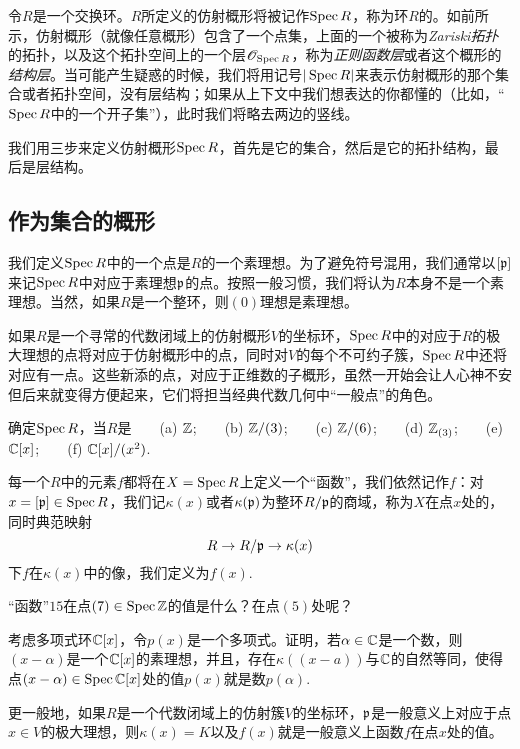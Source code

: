 令$R$是一个交换环。$R$所定义的仿射概形将被记作$\operatorname{Spec} R$，称为环$R$的。如前所示，仿射概形（就像任意概形）包含了一个点集，上面的一个被称为\textit{Zariski拓扑}的拓扑，以及这个拓扑空间上的一个层$\mathscr{O}_{\operatorname{Spec} R}$，称为\textit{正则函数层}或者这个概形的\textit{结构层}。当可能产生疑惑的时候，我们将用记号$|\operatorname{Spec} R|$来表示仿射概形的那个集合或者拓扑空间，没有层结构；如果从上下文中我们想表达的你都懂的（比如，“$\operatorname{Spec} R$中的一个开子集”），此时我们将略去两边的竖线。

我们用三步来定义仿射概形$\operatorname{Spec} R$，首先是它的集合，然后是它的拓扑结构，最后是层结构。

\subsection{作为集合的概形}

我们定义$\operatorname{Spec} R$中的一个点是$R$的一个素理想。为了避免符号混用，我们通常以$[\mathfrak{p}]$来记$\operatorname{Spec} R$中对应于素理想$\mathfrak{p}$的点。按照一般习惯，我们将认为$R$本身不是一个素理想。当然，如果$R$是一个整环，则$(0)$理想是素理想。

如果$R$是一个寻常的代数闭域上的仿射概形$V$的坐标环，$\operatorname{Spec} R$中的对应于$R$的极大理想的点将对应于仿射概形中的点，同时对$V$的每个不可约子簇，$\operatorname{Spec} R$中还将对应有一点。这些新添的点，对应于正维数的子概形，虽然一开始会让人心神不安但后来就变得方便起来，它们将担当经典代数几何中“一般点”的角色。

\begin{exe}
确定$\operatorname{Spec} R$，当$R$是~~~~(a) $\mathbb{Z}$;~~~~(b) $\mathbb{Z}/(3)$;~~~~(c) $\mathbb{Z}/(6)$;~~~~(d) $\mathbb{Z}_{(3)}$;~~~~(e) $\mathbb{C}[x]$;~~~~(f) $\mathbb{C}[x]/(x^2)$.
\end{exe}

每一个$R$中的元素$f$都将在$X=\operatorname{Spec} R$上定义一个“函数”，我们依然记作$f$：对$x=[\mathfrak{p}]\in \operatorname{Spec} R$，我们记$\kappa(x)$或者$\kappa(\mathfrak{p})$为整环$R/\mathfrak{p}$的商域，称为$X$在点$x$处的，同时典范映射
\[
	R\to R/\mathfrak{p}\to \kappa(x)
\]
下$f$在$\kappa(x)$中的像，我们定义为$f(x)$.

\begin{exe}
	“函数”$15$在点$(7)\in \operatorname{Spec} \mathbb{Z}$的值是什么？在点$(5)$处呢？
\end{exe}

\begin{exe}
	\begin{compactenum}[{(a)}]
		\item 考虑多项式环$\mathbb{C}[x]$，令$p(x)$是一个多项式。证明，若$\alpha\in\mathbb{C}$是一个数，则$(x-\alpha)$是一个$\mathbb{C}[x]$的素理想，并且，存在$\kappa((x-a))$与$\mathbb{C}$的自然等同，使得点$(x-\alpha)\in\operatorname{Spec}\mathbb{C}[x]$处的值$p(x)$就是数$p(\alpha)$.
		\item 更一般地，如果$R$是一个代数闭域上的仿射簇$V$的坐标环，$\mathfrak{p}$是一般意义上对应于点$x\in V$的极大理想，则$\kappa(x)=K$以及$f(x)$就是一般意义上函数$f$在点$x$处的值。
	\end{compactenum}
\end{exe}

